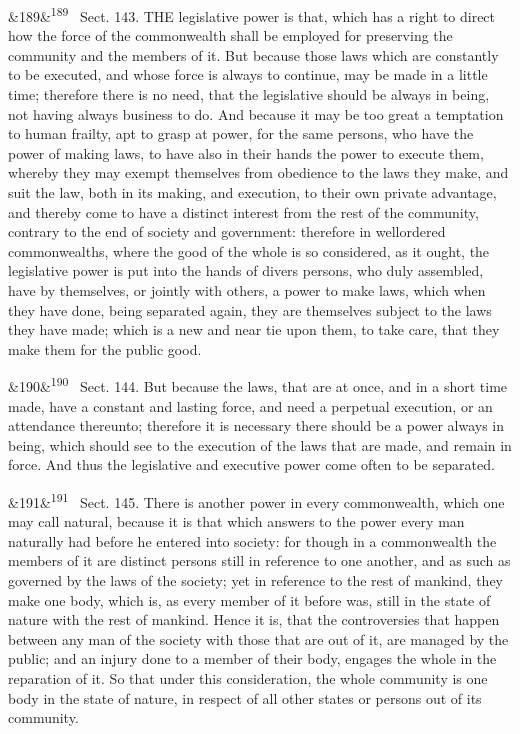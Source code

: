 \documentclass[12pt]{article}
\newcommand{\para}[1][]{\par\noindent\ifx&#1&\else\textsuperscript{\footnotesize #1}~\fi}
\begin{document}
\para[189] Sect. 143. THE legislative power is that, which has a right to direct how the force of the commonwealth shall be employed for preserving the community and the members of it. But because those laws which are constantly to be executed, and whose force is always to continue, may be made in a little time; therefore there is no need, that the legislative should be always in being, not having always business to do. And because it may be too great a temptation to human frailty, apt to grasp at power, for the same persons, who have the power of making laws, to have also in their hands the power to execute them, whereby they may exempt themselves from obedience to the laws they make, and suit the law, both in its making, and execution, to their own private advantage, and thereby come to have a distinct interest from the rest of the community, contrary to the end of society and government: therefore in wellordered commonwealths, where the good of the whole is so considered, as it ought, the legislative power is put into the hands of divers persons, who duly assembled, have by themselves, or jointly with others, a power to make laws, which when they have done, being separated again, they are themselves subject to the laws they have made; which is a new and near tie upon them, to take care, that they make them for the public good.

\para[190] Sect. 144. But because the laws, that are at once, and in a short time made, have a constant and lasting force, and need a perpetual execution, or an attendance thereunto; therefore it is necessary there should be a power always in being, which should see to the execution of the laws that are made, and remain in force. And thus the legislative and executive power come often to be separated.

\para[191] Sect. 145. There is another power in every commonwealth, which one may call natural, because it is that which answers to the power every man naturally had before he entered into society: for though in a commonwealth the members of it are distinct persons still in reference to one another, and as such as governed by the laws of the society; yet in reference to the rest of mankind, they make one body, which is, as every member of it before was, still in the state of nature with the rest of mankind. Hence it is, that the controversies that happen between any man of the society with those that are out of it, are managed by the public; and an injury done to a member of their body, engages the whole in the reparation of it. So that under this consideration, the whole community is one body in the state of nature, in respect of all other states or persons out of its community.
\end{document}
